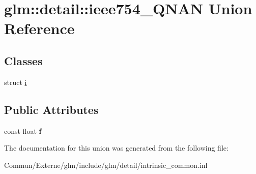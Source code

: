 \hypertarget{unionglm_1_1detail_1_1ieee754___q_n_a_n}{}\section{glm\+:\+:detail\+:\+:ieee754\+\_\+\+Q\+N\+AN Union Reference}
\label{unionglm_1_1detail_1_1ieee754___q_n_a_n}
\subsection*{Classes}
\begin{DoxyCompactItemize}
\item 
struct \hyperlink{structglm_1_1detail_1_1ieee754___q_n_a_n_1_1i}{i}
\end{DoxyCompactItemize}
\subsection*{Public Attributes}
\begin{DoxyCompactItemize}
\item 
const float {\bfseries f}\hypertarget{unionglm_1_1detail_1_1ieee754___q_n_a_n_ac5f04f4e605e4d08ddc2bacddf7eee65}{}\label{unionglm_1_1detail_1_1ieee754___q_n_a_n_ac5f04f4e605e4d08ddc2bacddf7eee65}

\end{DoxyCompactItemize}


The documentation for this union was generated from the following file\+:\begin{DoxyCompactItemize}
\item 
Commun/\+Externe/glm/include/glm/detail/intrinsic\+\_\+common.\+inl\end{DoxyCompactItemize}

